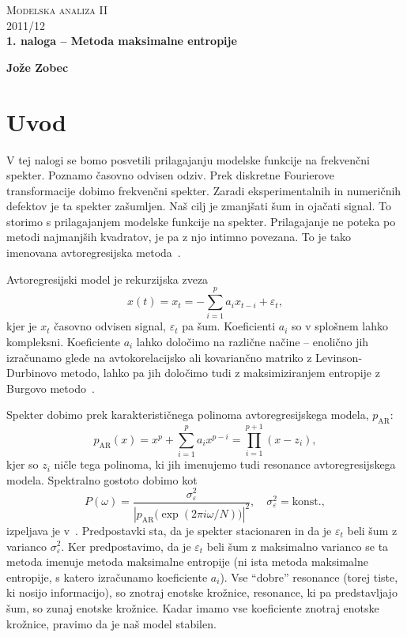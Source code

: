 \documentclass[a4 paper, 12pt]{article}
\newcommand{\e}{
	\ensuremath{\varepsilon}
}
\newcommand{\w}{
	\ensuremath{\omega}
}
\begin{document}
\begin{center}
\textsc{Modelska analiza II}\\
\textsc{2011/12}\\[0.5cm]
\textbf{1. naloga -- Metoda maksimalne entropije}
\end{center}
\begin{flushright}
\textbf{Jože Zobec}\\
\end{flushright}

\section{Uvod}

V tej nalogi se bomo posvetili prilagajanju modelske funkcije na frekven\v cni spekter. Poznamo \v casovno
odvisen odziv. Prek diskretne Fourierove transformacije dobimo frekven\v cni spekter. Zaradi eksperimentalnih
in numeri\v cnih defektov je ta spekter za\v sumljen. Na\v s cilj je zmanj\v sati \v sum in oja\v cati signal.
To storimo s prilagajanjem modelske funkcije na spekter. Prilagajanje ne poteka po metodi najmanj\v sih kvadratov,
je pa z njo intimno povezana. To je tako imenovana avtoregresijska metoda~\cite[str.~302]{sirca}.

Avtoregresijski model je rekurzijska zveza
\[
	x(t) = x_t = - \sum_{i = 1}^p a_i x_{t - i} + \e_t,
\]
kjer je $x_t$ \v casovno odvisen signal, $\e_t$ pa \v sum. Koeficienti $a_i$ so v splo\v snem lahko kompleksni.
Koeficiente $a_i$ lahko dolo\v cimo na razli\v cne na\v cine -- enoli\v cno jih izra\v cunamo glede na avtokorelacijsko
ali kovarian\v cno matriko z Levinson-Durbinovo metodo, lahko pa jih dolo\v cimo tudi z maksimiziranjem entropije z
Burgovo metodo~\cite{sirca}.

Spekter dobimo prek karakteristi\v cnega polinoma avtoregresijskega modela, $p_\mathrm{AR}$:
\[
	p_\mathrm{AR}(x) = x^p + \sum_{i = 1}^p a_i x^{p-i} = \prod_{i = 1}^{p+1} (x - z_i),
\]
kjer so $z_i$ ni\v cle tega polinoma, ki jih imenujemo tudi resonance avtoregresijskega modela. Spektralno gostoto
dobimo kot
\[
	P (\w) = \frac{\sigma^2_\e}{|p_\mathrm{AR}\big(\exp(2\pi i\w/N)\big)|^2}, \quad \sigma^2_\e = \text{konst.},
\]
izpeljava je v~\cite[str. 308-9]{sirca}.
Predpostavki sta, da je spekter stacionaren in da je $\e_t$ beli \v sum z varianco $\sigma^2_\e$. Ker predpostavimo,
da je $\e_t$ beli \v sum z maksimalno varianco se ta metoda imenuje metoda maksimalne entropije (ni ista metoda
maksimalne entropije, s katero izra\v cunamo koeficiente $a_i$). Vse "`dobre"' resonance (torej tiste, ki nosijo
informacijo), so znotraj enotske kro\v znice, resonance, ki pa predstavljajo \v sum, so zunaj enotske kro\v znice. Kadar
imamo vse koeficiente znotraj enotske kro\v znice, pravimo da je na\v s model stabilen.
\end{document}
